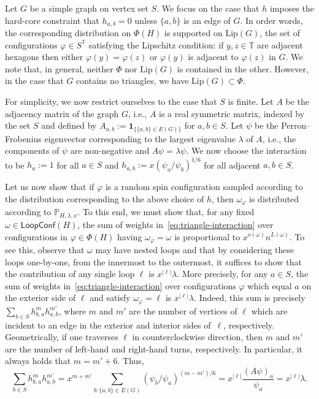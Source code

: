 \documentclass[12pt,reqno]{article}
\def\T{\mathbb{T}}
\def\one{\mathbf{1}}
\renewcommand{\Pr}{\mathbb{P}}
\newcommand{\LC}{\mathsf{LoopConf}}
\begin{document}
Let $G$ be a simple graph on vertex set $S$. We focus on the case that $h$ imposes the hard-core constraint that $h_{a,b}=0$ unless $\{a,b\}$ is an edge of $G$. In order words, the corresponding distribution on $\Phi(H)$ is supported on $\text{Lip}(G)$, the set of configurations $\varphi \in S^\T$ satisfying the Lipschitz condition: if $y,z \in \T$ are adjacent hexagons then either $\varphi(y)=\varphi(z)$ or $\varphi(y)$ is adjacent to $\varphi(z)$ in $G$. We note that, in general, neither $\Phi$ nor $\text{Lip}(G)$ is contained in the other. However, in the case that $G$ contains no triangles, we have $\text{Lip}(G) \subset \Phi$.

For simplicity, we now restrict ourselves to the case that $S$ is finite.
Let $A$ be the adjacency matrix of the graph $G$, i.e., $A$ is a real symmetric matrix, indexed by the set $S$ and defined by $A_{a,b} := \one_{\{\{a,b\} \in E(G)\}}$ for $a,b \in S$. Let $\psi$ be the Perron--Frobenius eigenvector corresponding to the largest eigenvalue $\lambda$ of $A$, i.e., the components of $\psi$ are non-negative and $A\psi=\lambda\psi$. We now choose the interaction to be $h_a := 1$ for all $a\in S$ and $h_{a,b} := x (\psi_a/\psi_b)^{1/6}$ for all adjacent $a,b \in S$.

Let us now show that if $\varphi$ is a random spin configuration sampled according to the distribution corresponding to the above choice of $h$, then $\omega_\varphi$ is distributed according to $\Pr_{H,\lambda,x}$.
To this end, we must show that, for any fixed $\omega \in \LC(H)$, the sum of weights in~\eqref{eq:triangle-interaction} over configurations in $\varphi \in \Phi(H)$ having $\omega_\varphi = \omega$ is proportional to $x^{o(\omega)}n^{L(\omega)}$. To see this, observe that $\omega$ may have nested loops and that by considering these loops one-by-one, from the innermost to the outermost, it suffices to show that the contribution of any single loop $\ell$ is $x^{|\ell|}\lambda$.
More precisely, for any $a \in S$, the sum of weights in~\eqref{eq:triangle-interaction} over configurations $\varphi$ which equal $a$ on the exterior side of $\ell$ and satisfy $\omega_\varphi=\ell$ is $x^{|\ell|}\lambda$. Indeed, this sum is precisely $\sum_{b \in S} h_{b,a}^m h_{a,b}^{m'}$, where $m$ and $m'$ are the number of vertices of $\ell$ which are incident to an edge in the exterior and interior sides of~$\ell$, respectively. Geometrically, if one traverses $\ell$ in counterclockwise direction, then $m$ and $m'$ are the number of left-hand and right-hand turns, respectively. In particular, it always holds that $m=m'+6$. Thus,
\[ \sum_{b \in S} h_{b,a}^m h_{a,b}^{m'} = x^{m+m'} \sum_{b:\{a,b\} \in E(G)} (\psi_b/\psi_a)^{(m-m')/6} = x^{|\ell|} \frac{(A \psi)_a}{\psi_a} = x^{|\ell|} \lambda .\]
\end{document}
